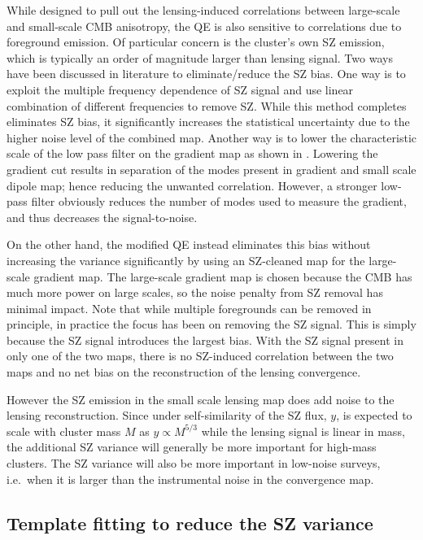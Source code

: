 While designed to pull out the lensing-induced correlations between large-scale and small-scale CMB anisotropy, the QE is also sensitive to  correlations due to foreground emission.
Of particular concern is  the cluster's own SZ emission, which is typically an order of magnitude larger than lensing signal. 
Two ways have been discussed in literature to eliminate/reduce the SZ bias.
One way is to exploit the multiple frequency dependence of SZ signal and use linear combination of different frequencies to remove SZ.
While this method completes eliminates SZ bias, it significantly increases the statistical uncertainty due to the higher noise level of the combined map.
Another way is to lower the characteristic scale of the low pass filter on the gradient map as shown in  \citet{hu07}.
Lowering the gradient cut results in separation of the modes present in gradient and small scale dipole map; hence reducing the unwanted correlation. 
However, a stronger low-pass filter obviously reduces the number of modes used to measure the gradient, and thus decreases the signal-to-noise. 

On the other hand, the modified QE instead eliminates this bias without increasing the variance significantly by using an SZ-cleaned map for the large-scale gradient map. 
The large-scale gradient map is chosen because the CMB has much more power on large scales, so the noise penalty from SZ removal has minimal impact. 
Note that while multiple foregrounds can be removed in principle, in practice the focus has been on removing the SZ signal. 
This is simply because the SZ signal introduces the largest bias.  
With the SZ signal present in only one of the two maps, there is no SZ-induced correlation between the two maps and no net bias on the reconstruction of the lensing convergence. 

However the SZ emission in the small scale lensing map does add noise to the lensing reconstruction. 
Since under self-similarity of the SZ flux, $y$, is expected to scale with cluster mass $M$ as $y\propto M^{5/3}$ while the lensing signal is linear in mass, the additional SZ variance will generally be more important for high-mass clusters. 
The SZ variance will also be more important in low-noise surveys, i.e.~when it is larger than the instrumental noise in the convergence map.%

\subsection{Template fitting to reduce the SZ variance}
\label{sec_sz_template_fitting}

